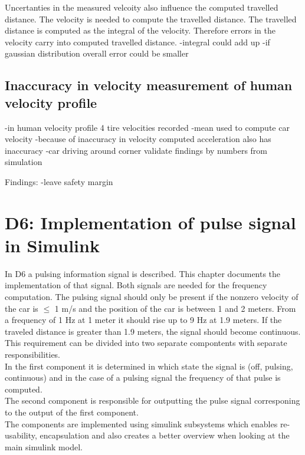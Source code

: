 Uncertanties in the measured velcoity also influence the computed travelled distance.
The velocity is needed to compute the travelled distance. The travelled distance is computed as the integral of the velocity. Therefore errors in the velocity carry into computed travelled distance.
-integral could add up
-if gaussian distribution overall error could be smaller

\section{Inaccuracy in velocity measurement of human velocity profile}

-in human velocity profile 4 tire velocities recorded
-mean used to compute car velocity
-because of inaccuracy in velocity computed acceleration also has inaccuracy
-car driving around corner
validate findings by numbers from simulation

Findings:
-leave safety margin

\chapter{D6: Implementation of pulse signal in Simulink}\label{cha:D6}

In D6 a pulsing information signal is described. This chapter documents the implementation of that signal.
Both signals are needed for the frequency computation.
The pulsing signal should only be present if the nonzero velocity of the car is $\leq$ 1 m/s and the position of the car is between 1 and 2 meters. From a frequency of 1 Hz at 1 meter it should rise up to 9 Hz at 1.9 meters. If the traveled distance is greater than 1.9 meters, the signal should become continuous.\\
This requirement can be divided into two separate compontents with separate responsibilities.\\
In the first component it is determined in which state the signal is (off, pulsing, continuous) and in the case of a pulsing signal the frequency of that pulse is computed.\\
The second component is responsible for outputting the pulse signal corresponing to the output of the first component.\\
The components are implemented using simulink subsystems which enables re-usability, encapsulation and also creates a better overview when looking at the main simulink model.\\
